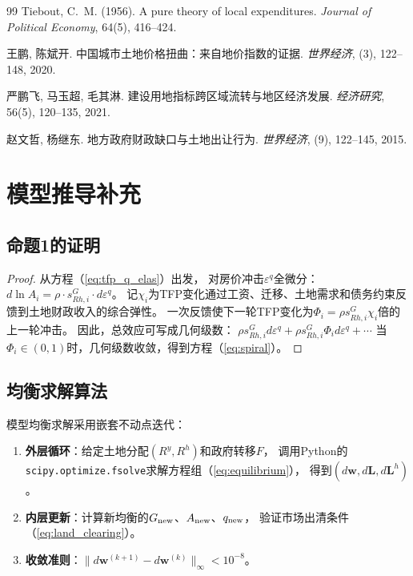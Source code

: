 \documentclass[UTF8,a4paper,12pt]{ctexart}
\theoremstyle{plain}
\theoremstyle{definition}
\theoremstyle{remark}
\newcommand{\Ry}{R^{y}}
\newcommand{\Rh}{R^{h}}
\begin{document}
\begin{thebibliography}{99}
Tiebout, C.~M. (1956).
A pure theory of local expenditures.
\textit{Journal of Political Economy}, 64(5), 416--424.

王鹏, 陈斌开.
中国城市土地价格扭曲：来自地价指数的证据.
\textit{世界经济}, (3), 122--148, 2020.

严鹏飞, 马玉超, 毛其淋.
建设用地指标跨区域流转与地区经济发展.
\textit{经济研究}, 56(5), 120--135, 2021.

赵文哲, 杨继东.
地方政府财政缺口与土地出让行为.
\textit{世界经济}, (9), 122--145, 2015.

\end{thebibliography}

\appendix
\section{模型推导补充}

\subsection{命题1的证明}

\begin{proof}
从方程（\ref{eq:tfp_q_elas}）出发，
对房价冲击$\varepsilon^q$全微分：
$d\ln A_i = \rho\cdot s^G_{Rh,i}\cdot d\varepsilon^q$。
记$\chi_i$为TFP变化通过工资、迁移、土地需求和债务约束反馈到土地财政收入的综合弹性。
一次反馈使下一轮TFP变化为$\Phi_i=\rho s^G_{Rh,i}\chi_i$倍的上一轮冲击。
因此，总效应可写成几何级数：
$\rho s^G_{Rh,i}d\varepsilon^q + \rho s^G_{Rh,i}\Phi_i d\varepsilon^q + \cdots$
当$\Phi_i\in(0,1)$时，几何级数收敛，得到方程（\ref{eq:spiral}）。
\end{proof}

\subsection{均衡求解算法}

模型均衡求解采用嵌套不动点迭代：
\begin{enumerate}[leftmargin=2em]
\item \textbf{外层循环}：给定土地分配$(\Ry,\Rh)$和政府转移$F$，
  调用Python的\texttt{scipy.optimize.fsolve}求解方程组（\ref{eq:equilibrium}），
  得到$(d\bm{w},d\bm{L},d\bm{L}^h)$。
\item \textbf{内层更新}：计算新均衡的$G_{\rm new}$、$A_{\rm new}$、$q_{\rm new}$，
  验证市场出清条件（\ref{eq:land_clearing}）。
\item \textbf{收敛准则}：$\|d\bm{w}^{(k+1)}-d\bm{w}^{(k)}\|_\infty < 10^{-8}$。
\end{enumerate}
\end{document}
